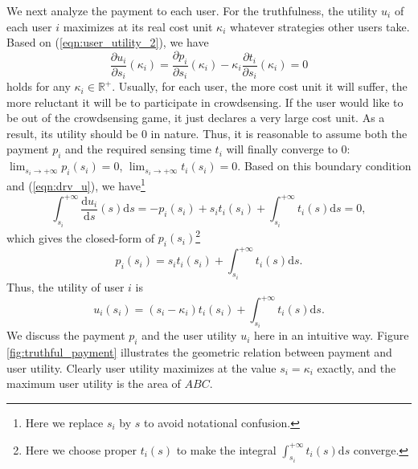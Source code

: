 \documentclass[conference]{IEEEtran}
\theoremstyle{definition}
\begin{document}
{We next analyze the payment to each user. For the truthfulness, the utility $u_i$ of each user $i$ maximizes at its real cost unit $\kappa_i$ whatever strategies other users take. Based on (\ref{eqn:user_utility_2}), we have
\begin{equation}
\label{eqn:drv_u}
\frac{\partial u_i}{\partial s_i}(\kappa_i) = \frac{\partial p_i}{\partial s_i}(\kappa_i)-\kappa_i \frac{\partial t_i}{\partial s_i}(\kappa_i)=0
\end{equation}
holds for any $\kappa_i\in\mathbb{R}^+$. Usually, for each user, the more cost unit it will suffer, the more reluctant it will be to participate in crowdsensing. If the user would like to be out of the crowdsensing game, it just declares a very large cost unit. As a result, its utility should be 0 in nature. Thus, it is reasonable to assume both the payment $p_i$ and the required sensing time $t_i$ will finally converge to 0: $\lim_{s_i\to+\infty}p_i(s_i)=0$, $\lim_{s_i\to+\infty}t_i(s_i)=0$. Based on this boundary condition and (\ref{eqn:drv_u}), we have\footnote{Here we replace $s_i$ by $s$ to avoid notational confusion.}
\begin{equation}
\int_{s_i}^{+\infty}\frac{\mathrm{d} u_i}{\mathrm{d} s}(s) \mathrm{d}s
=-p_i(s_i)+s_it_i(s_i)+\int_{s_i}^{+\infty}t_i(s)\mathrm{d}s=0,
\end{equation}
which gives the closed-form of $p_i(s_i)$\footnote{Here we choose proper $t_i(s)$ to make the integral $\int_{s_i}^{+\infty}t_i(s)\mathrm{d}s$ converge.}
\begin{equation}
\label{eqn:payment}
p_i(s_i)=s_it_i(s_i)+\int_{s_i}^{+\infty}t_i(s)\mathrm{d}s.
\end{equation}
Thus, the utility of user $i$ is
\begin{equation}
\label{eqn:utility_final}
u_i(s_i)=(s_i-\kappa_i)t_i(s_i)+\int_{s_i}^{+\infty}t_i(s)\mathrm{d}s.
\end{equation}
We discuss the payment $p_i$ and the user utility $u_i$ here in an intuitive way. Figure \ref{fig:truthful_payment} illustrates the geometric relation between payment and user utility. Clearly user utility maximizes at the value $s_i = \kappa_i$ exactly, and the maximum user utility is the area of $ABC$.
\begin{figure}[!t]
\centering{}

\end{figure}}
\end{document}

